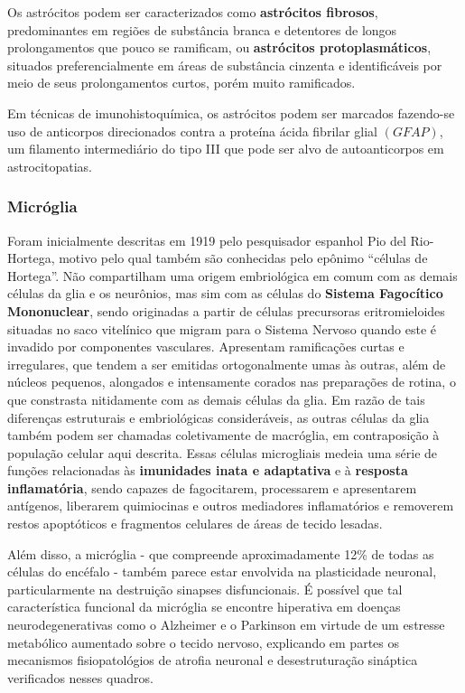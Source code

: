 \documentclass[
]{book}
\begin{document}
Os astrócitos podem ser caracterizados como \textbf{astrócitos fibrosos}, predominantes em regiões de substância branca e detentores de longos prolongamentos que pouco se ramificam, ou \textbf{astrócitos protoplasmáticos}, situados preferencialmente em áreas de substância cinzenta e identificáveis por meio de seus prolongamentos curtos, porém muito ramificados.

Em técnicas de imunohistoquímica, os astrócitos podem ser marcados fazendo-se uso de anticorpos direcionados contra a proteína ácida fibrilar glial \((GFAP)\), um filamento intermediário do tipo III que pode ser alvo de autoanticorpos em astrocitopatias.

\hypertarget{micruxf3glia}{%
\subsubsection*{Micróglia}\label{micruxf3glia}}

Foram inicialmente descritas em 1919 pelo pesquisador espanhol Pio del Rio-Hortega, motivo pelo qual também são conhecidas pelo epônimo ``células de Hortega''. Não compartilham uma origem embriológica em comum com as demais células da glia e os neurônios, mas sim com as células do \textbf{Sistema Fagocítico Mononuclear}, sendo originadas a partir de células precursoras eritromieloides situadas no saco vitelínico que migram para o Sistema Nervoso quando este é invadido por componentes vasculares. Apresentam ramificações curtas e irregulares, que tendem a ser emitidas ortogonalmente umas às outras, além de núcleos pequenos, alongados e intensamente corados nas preparações de rotina, o que constrasta nitidamente com as demais células da glia. Em razão de tais diferenças estruturais e embriológicas consideráveis, as outras células da glia também podem ser chamadas coletivamente de macróglia, em contraposição à população celular aqui descrita. Essas células microgliais medeia uma série de funções relacionadas às \textbf{imunidades inata e adaptativa} e à \textbf{resposta inflamatória}, sendo capazes de fagocitarem, processarem e apresentarem antígenos, liberarem quimiocinas e outros mediadores inflamatórios e removerem restos apoptóticos e fragmentos celulares de áreas de tecido lesadas.

Além disso, a micróglia - que compreende aproximadamente 12\% de todas as células do encéfalo - também parece estar envolvida na plasticidade neuronal, particularmente na destruição sinapses disfuncionais. É possível que tal característica funcional da micróglia se encontre hiperativa em doenças neurodegenerativas como o Alzheimer e o Parkinson em virtude de um estresse metabólico aumentado sobre o tecido nervoso, explicando em partes os mecanismos fisiopatológios de atrofia neuronal e desestruturação sináptica verificados nesses quadros.
\end{document}

